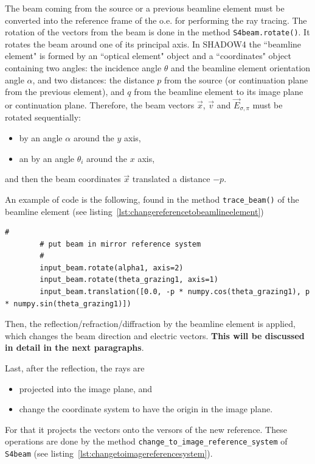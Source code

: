 \documentclass{iucr}
\begin{document}
The beam coming from the source or a previous beamline element must be converted into the reference frame of the o.e. for performing the ray tracing.
The rotation of the vectors from the beam is done in the method {\tt S4beam.rotate()}.
It rotates the beam around one of its principal axis.
In SHADOW4 the ``beamline element" is formed by an ``optical element" object and a ``coordinates" object containing two angles: the incidence angle $\theta$ and the beamline element orientation angle $\alpha$, and two distances: the distance $p$ from the source (or continuation plane from the previous element), and $q$ from the beamline element to its image plane or continuation plane.
Therefore, the beam vectors $\vec{x}$,  $\vec{v}$ and $\vec{E}_{\sigma,\pi}$ must be rotated sequentially:
\begin{itemize}
    \item by an angle $\alpha$ around the $y$ axis, 
    \item an by an angle $\theta_i$ around the $x$ axis,
\end{itemize}
and then the beam coordinates $\vec{x}$ translated a distance $-p$. 

An example of code is the following, found in the method {\tt trace\_beam()} of the beamline element (see listing~\ref{lst:changereferencetobeamlineelement})

\begin{lstlisting}[caption={\it Piece of code that changes the beam from the source reference frame to the local beamline element frame.}, label={lst:changereferencetobeamlineelement}, captionpos=b]
        #
        # put beam in mirror reference system
        #
        input_beam.rotate(alpha1, axis=2)
        input_beam.rotate(theta_grazing1, axis=1)
        input_beam.translation([0.0, -p * numpy.cos(theta_grazing1), p * numpy.sin(theta_grazing1)])
\end{lstlisting}

Then, the reflection/refraction/diffraction by the beamline element is applied, which changes the beam direction and electric vectors.
{\bf This will be discussed in detail in the next paragraphs}.

Last, after the reflection, the rays are 
\begin{itemize}
    \item projected into the image plane, and
    \item change the coordinate system to have the origin in the image plane.
\end{itemize}
For that it projects the  vectors onto the versors of the new reference. 
These operations are done by the method {\tt change\_to\_image\_reference\_system} of {\tt S4beam} (see listing~\ref{lst:changetoimagereferencesystem}).
\end{document}
